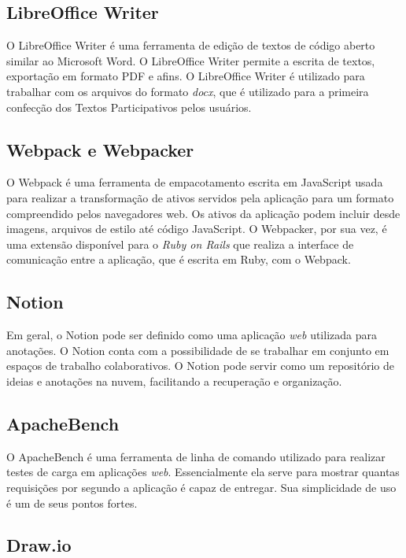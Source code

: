 \subsection {LibreOffice Writer}

O LibreOffice Writer é uma ferramenta de edição de textos de código aberto similar ao Microsoft Word. O LibreOffice Writer permite a escrita de textos, exportação em formato PDF e afins. O LibreOffice Writer é utilizado para trabalhar com os arquivos do formato \textit{docx}, que é utilizado para a primeira confecção dos Textos Participativos pelos usuários.

\subsection {Webpack e Webpacker}

O Webpack é uma ferramenta de empacotamento escrita em JavaScript usada para realizar a transformação de ativos servidos pela aplicação para um formato compreendido pelos navegadores web. Os ativos da aplicação podem incluir desde imagens, arquivos de estilo até código JavaScript. O Webpacker, por sua vez, é uma extensão disponível para o \textit{Ruby on Rails} que realiza a interface de comunicação entre a aplicação, que é escrita em Ruby, com o Webpack.

\subsection {Notion}

Em geral, o Notion pode ser definido como uma aplicação \textit{web} utilizada para anotações. O Notion conta com a possibilidade de se trabalhar em conjunto em espaços de trabalho colaborativos. O Notion pode servir como um repositório de ideias e anotações na nuvem, facilitando a recuperação e organização.

\subsection {ApacheBench}

O ApacheBench é uma ferramenta de linha de comando utilizado para realizar testes de carga em aplicações \textit{web}. Essencialmente ela serve para mostrar quantas requisições por segundo a aplicação é capaz de entregar. Sua simplicidade de uso é um de seus pontos fortes.

\subsection {Draw.io}

